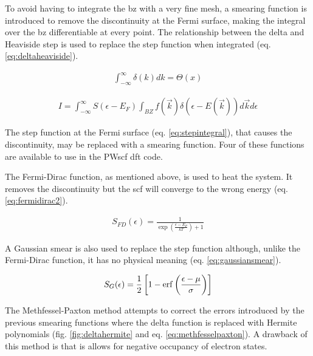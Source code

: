 To avoid having to integrate the \acrshort{bz} with a very fine mesh, a smearing function is introduced to remove the discontinuity at the Fermi surface, making the integral over the \acrshort{bz} differentiable at every point.  The relationship between the delta and Heaviside step is used to replace the step function when integrated (eq. \ref{eq:deltaheaviside}).

\begin{equation}
\begin{split}
\int_{-\infty}^{\infty} \delta(k)dk = \Theta(x)
\end{split}
\label{eq:deltaheaviside}
\end{equation}

\begin{equation}
\begin{split}
I = \int_{-\infty}^{\infty} S(\epsilon-E_F) \int_{BZ} f(\vec{k}) \delta(\epsilon - E(\vec{k})) d\vec{k} d\epsilon
\end{split}
\label{eq:stepintegral}
\end{equation}

The step function at the Fermi surface (eq. \ref{eq:stepintegral}), that causes the discontinuity, may be replaced with a smearing function\cite{methfesslpaxton}.  Four of these functions are available to use in the PWscf \acrshort{dft} code.

The Fermi-Dirac function, as mentioned above, is used to heat the system.  It removes the discontinuity but the \acrshort{scf} will converge to the wrong energy (eq. \ref{eq:fermidirac2}).

\begin{equation}
\begin{split}
S_{FD}(\epsilon) = \frac{1}{\exp(\frac{\epsilon - E_F}{kT}) + 1}
\end{split}
\label{eq:fermidirac2}
\end{equation}

A Gaussian smear is also used to replace the step function although, unlike the Fermi-Dirac function, it has no physical meaning (eq. \ref{eq:gaussiansmear}).

\begin{equation}
\begin{split}
S_{G}(\epsilon) = \frac{1}{2} \left[ 1 - \erf\left(\frac{\epsilon - \mu}{\sigma}\right)\right]
\end{split}
\label{eq:gaussiansmear}
\end{equation}

The Methfessel-Paxton method attempts to correct the errors introduced by the previous smearing functions where the delta function is replaced with Hermite polynomials (fig. \ref{fig:deltahermite} and eq. \ref{eq:methfesselpaxton}).  A drawback of this method is that is allows for negative occupancy of electron states\cite{marzarithesis1}.

